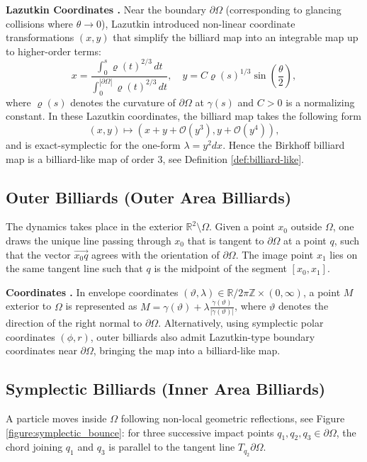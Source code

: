\documentclass[10pt]{article}
\begin{document}
\medskip
\noindent\textbf{Lazutkin Coordinates \cite{Lazutkin_book}.} 
Near the boundary $\partial\Omega$ (corresponding to glancing collisions where $\theta \to 0$), Lazutkin introduced non-linear coordinate transformations $(x, y)$ that simplify the billiard map into an integrable map up to higher-order terms:
\[
x = \frac{\int_0^s \varrho(t)^{2/3} \, dt}{\int_0^{|\partial\Omega|} \varrho(t)^{2/3} \, dt}, \quad y = C \varrho(s)^{1/3} \sin\left(\frac{\theta}{2}\right),
\]
where $\varrho(s)$ denotes the curvature of $\partial\Omega$ at $\gamma(s)$ and $C > 0$ is a normalizing constant. In these Lazutkin coordinates, the billiard map takes the following form
\[
(x, y) \mapsto (x + y + \mathcal{O}(y^3), y + \mathcal{O}(y^4)),
\]
and is exact-symplectic for the one-form $\lambda=y^2dx$. Hence the Birkhoff billiard map is a billiard-like map of order $3$, see Definition \ref{def:billiard-like}.

\subsection{Outer Billiards (Outer Area Billiards)}
The dynamics takes place in the exterior $\mathbb{R}^2 \setminus \Omega$. Given a point $x_0$ outside $\Omega$, one draws the unique line passing through $x_0$ that is tangent to $\partial\Omega$ at a point $q$, such that the vector $\vec{x_0 q}$ agrees with the orientation of $\partial\Omega$. The image point $x_1$ lies on the same tangent line such that $q$ is the midpoint of the segment $[x_0, x_1]$.

\medskip
\noindent\textbf{Coordinates \cite{Douady}.} 
In envelope coordinates $(\vartheta, \lambda) \in \mathbb{R}/2\pi\mathbb{Z} \times (0, \infty)$, a point $M$ exterior to $\Omega$ is represented as $M = \gamma(\vartheta) + \lambda \frac{\dot{\gamma}(\vartheta)}{|\dot{\gamma}(\vartheta)|}$, where $\vartheta$ denotes the direction of the right normal to $\partial\Omega$. Alternatively, using symplectic polar coordinates $(\phi, r)$, outer billiards also admit Lazutkin-type boundary coordinates near $\partial\Omega$, bringing the map into a billiard-like map.

\subsection{Symplectic Billiards (Inner Area Billiards)}

A particle moves inside $\Omega$ following non-local geometric reflections, see Figure \ref{figure:symplectic_bounce}: for three successive impact points $q_1, q_2, q_3 \in \partial\Omega$, the chord joining $q_1$ and $q_3$ is parallel to the tangent line $T_{q_2}\partial\Omega$.
\end{document}
